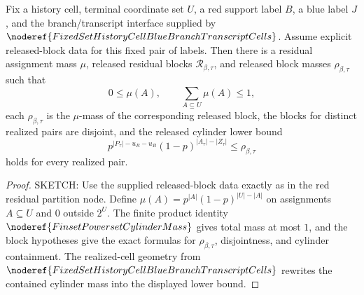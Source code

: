 \begin{helper}
Fix a history cell, terminal coordinate set \(U\), a red support label \(B\),
a blue label \(J\), and the branch/transcript interface supplied by
\(\noderef{FixedSetHistoryCellBlueBranchTranscriptCells}\).  Assume explicit
released-block data for this fixed pair of labels.  Then there is a residual
assignment mass \(\mu\), released residual blocks
\(\mathcal R_{\beta,\tau}\), and released block masses \(\rho_{\beta,\tau}\)
such that
\[
0\le \mu(A),\qquad \sum_{A\subseteq U}\mu(A)\le1,
\]
each \(\rho_{\beta,\tau}\) is the \(\mu\)-mass of the corresponding released
block, the blocks for distinct realized pairs are disjoint, and the released
cylinder lower bound
\[
p^{|P_\tau|-u_R-u_B}(1-p)^{|A_\tau|-|Z_\tau|}
\le \rho_{\beta,\tau}
\]
holds for every realized pair.
\end{helper}
\begin{proof}
SKETCH:
Use the supplied released-block data exactly as in the red residual partition
node.  Define \(\mu(A)=p^{|A|}(1-p)^{|U|-|A|}\) on assignments
\(A\subseteq U\) and \(0\) outside \(2^U\).  The finite product identity
\(\noderef{FinsetPowersetCylinderMass}\) gives total mass at most \(1\), and
the block hypotheses give the exact formulas for \(\rho_{\beta,\tau}\),
disjointness, and cylinder containment.  The realized-cell geometry from
\(\noderef{FixedSetHistoryCellBlueBranchTranscriptCells}\) rewrites the
contained cylinder mass into the displayed lower bound.
\end{proof}
